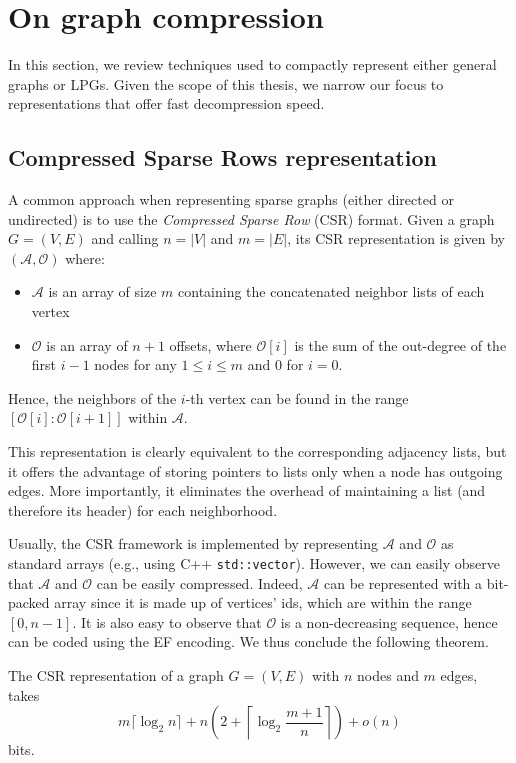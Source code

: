 \section{On graph compression}\label{sec:graph-compression}
In this section, we review techniques used to compactly represent either general graphs or LPGs. Given the scope of this thesis, we narrow our focus to representations that offer fast decompression speed.

\subsection{Compressed Sparse Rows representation}\label{sec:csr}
A common approach when representing sparse graphs (either directed or undirected) is to use the \emph{Compressed Sparse Row} (CSR) format. Given a graph \( G = (V, E) \) and calling $n = |V|$ and $m = |E|$, its CSR representation is given by $(\mathcal{A}, \mathcal{O})$ where:
\begin{itemize}
    \item $\mathcal A$ is an array of size $m$ containing the concatenated neighbor lists of each vertex
    \item $\mathcal O$ is an array of $n + 1$ offsets, where $\mathcal{O}[i]$ is the sum of the out-degree of the first $i - 1$ nodes for any $1 \le i \le  m$ and $0$ for $i = 0$.
\end{itemize}
Hence, the neighbors of the $i$-th vertex can be found in the range $[\mathcal{O}[i] : \mathcal{O}[i + 1]]$ within $\mathcal{A}$.

This representation is clearly equivalent to the corresponding adjacency lists, but it offers the advantage of storing pointers to lists only when a node has outgoing edges. More importantly, it eliminates the overhead of maintaining a list (and therefore its header) for each neighborhood.

Usually, the CSR framework is implemented by representing $\mathcal A$ and $\mathcal O$ as standard arrays (e.g., using C++ \verb^std::vector^). However, we can easily observe that $\mathcal{A}$ and $\mathcal O$ can be easily compressed. 
Indeed,  $\mathcal A$  can be represented with a bit-packed array since it is made up of vertices' ids, which are within the range $[0, n - 1]$. It is also easy to observe that $\mathcal O$ is a non-decreasing sequence, hence can be coded using the EF encoding. We thus conclude the following theorem.

\begin{theorem}
The CSR representation of a graph $G = (V, E)$ with $n$ nodes and $m$ edges, takes 
\begin{equation*}
    m \lceil \log_2 n \rceil + n \left(2 + \left\lceil \log_2 \frac{m + 1}{n} \right\rceil \right) + o(n)
\end{equation*}
bits.
\end{theorem}

